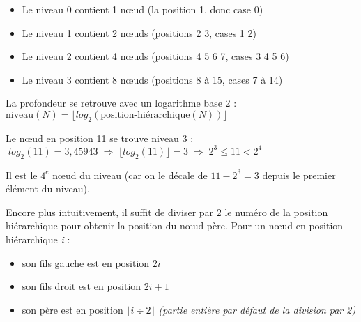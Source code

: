 \documentclass[11pt,a4paper]{article}
\begin{document}
\begin{itemize}
\item Le niveau 0 contient 1 nœud (la position 1, donc case 0)
\item Le niveau 1 contient 2 nœuds (positions 2 3, cases 1 2)
\item Le niveau 2 contient 4 nœuds (positions 4 5 6 7, cases 3 4 5 6)
\item Le niveau 3 contient 8 nœuds (positions 8 à 15, cases 7 à 14)
\end{itemize}

La profondeur se retrouve avec un logarithme base 2 : $ \text{niveau}(N) = \lfloor log_{2}(\text{position-hiérarchique}(N)) \rfloor $

Le nœud en position 11 se trouve niveau 3 : $ \; log_{2}(11) = 3,45943 \; \Rightarrow \; \lfloor log_{2}(11) \rfloor = 3 \; \Rightarrow \; 2^{3} \leq 11 < 2^{4} $

Il est le $4^{e}$ nœud du niveau (car on le décale de $11 - 2^{3} = 3$ depuis le premier élément du niveau).

\medskip

%

Encore plus intuitivement, il suffit de diviser par 2 le numéro de la position hiérarchique pour obtenir la position du nœud père.
%
Pour un nœud en position hiérarchique \textit{i} :
\begin{itemize}
\item son fils gauche est en position $ 2i $
\item son fils droit est en position $ 2i + 1 $
\item son père est en position $ \lfloor i \div 2 \rfloor $ \footnotesize{\textit{(partie entière par défaut de la division par 2)}}
\end{itemize}
\end{document}
